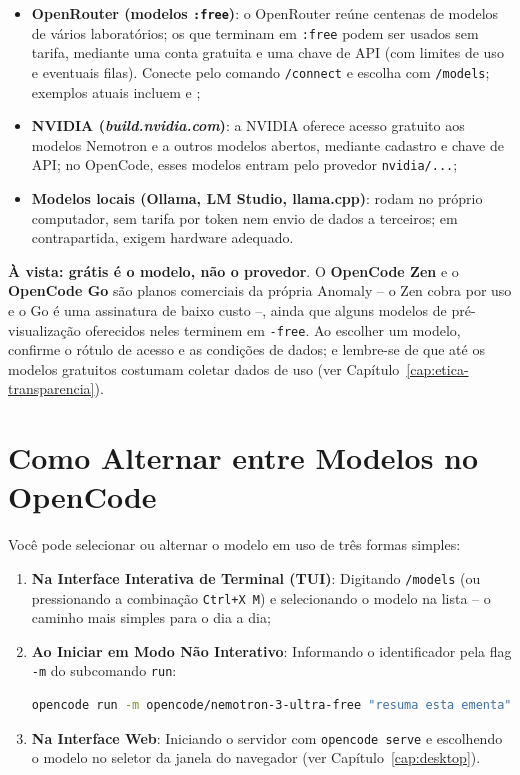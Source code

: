 \begin{itemize}
  \item \textbf{OpenRouter (modelos \texttt{:free})}: o OpenRouter re{\'u}ne centenas de modelos de v{\'a}rios laborat{\'o}rios; os que terminam em \texttt{:free} podem ser usados sem tarifa, mediante uma conta gratuita e uma chave de API (com limites de uso e eventuais filas). Conecte pelo comando \texttt{/connect} e escolha com \texttt{/models}; exemplos atuais incluem  e ;
  \item \textbf{NVIDIA (\emph{build.nvidia.com})}: a NVIDIA oferece acesso gratuito aos modelos Nemotron e a outros modelos abertos, mediante cadastro e chave de API; no OpenCode, esses modelos entram pelo provedor \texttt{nvidia/...};
  \item \textbf{Modelos locais (Ollama, LM Studio, llama.cpp)}: rodam no pr{\'o}prio computador, sem tarifa por token nem envio de dados a terceiros; em contrapartida, exigem hardware adequado.
\end{itemize}

\begin{atencaopedagogica}
\textbf{{\`A} vista: gr{\'a}tis {\'e} o modelo, n{\~a}o o provedor}. O \textbf{OpenCode Zen} e o \textbf{OpenCode Go} s{\~a}o planos comerciais da pr{\'o}pria Anomaly -- o Zen cobra por uso e o Go {\'e} uma assinatura de baixo custo --, ainda que alguns modelos de pr{\'e}-visualiza{\c c}{\~a}o oferecidos neles terminem em \texttt{-free}. Ao escolher um modelo, confirme o r{\'o}tulo de acesso e as condi{\c c}{\~o}es de dados; e lembre-se de que at{\'e} os modelos gratuitos costumam coletar dados de uso (ver Cap{\'i}tulo~\ref{cap:etica-transparencia}).
\end{atencaopedagogica}

\section{Como Alternar entre Modelos no OpenCode}

Voc{\^e} pode selecionar ou alternar o modelo em uso de tr{\^e}s formas simples:

\begin{enumerate}
  \item \textbf{Na Interface Interativa de Terminal (TUI)}: Digitando \texttt{/models} (ou pressionando a combina{\c c}{\~a}o \texttt{Ctrl+X M}) e selecionando o modelo na lista -- o caminho mais simples para o dia a dia;
  \item \textbf{Ao Iniciar em Modo N{\~a}o Interativo}: Informando o identificador pela flag \texttt{-m} do subcomando \texttt{run}:
  \begin{lstlisting}[language=bash]
  opencode run -m opencode/nemotron-3-ultra-free "resuma esta ementa"
  \end{lstlisting}
  \item \textbf{Na Interface Web}: Iniciando o servidor com \texttt{opencode serve} e escolhendo o modelo no seletor da janela do navegador (ver Cap{\'i}tulo~\ref{cap:desktop}).
\end{enumerate}
